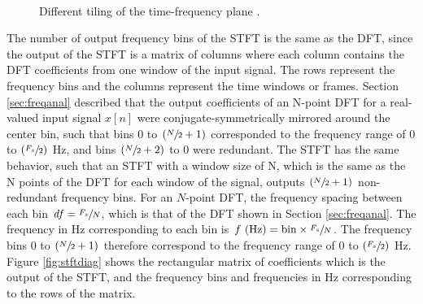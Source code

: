\documentclass[report.tex]{subfiles}
\begin{document}
\begin{figure}[ht]
	\centering
	\\
	\caption{Different tiling of the time-frequency plane \parencite[326, 327]{gabordiagrams}.}
	\label{fig:gabortf}
\end{figure}

The number of output frequency bins of the STFT is the same as the DFT, since the output of the STFT is a matrix of columns where each column contains the DFT coefficients from one window of the input signal. The rows represent the frequency bins and the columns represent the time windows or frames. Section \ref{sec:freqanal} described that the output coefficients of an N-point DFT for a real-valued input signal $x[n]$ were conjugate-symmetrically mirrored around the center bin, such that bins 0 to $(\sfrac{N}{2}+1)$ corresponded to the frequency range of 0 to $(\sfrac{F_{s}}{2})$ Hz, and bins $(\sfrac{N}{2}+2)$ to 0 were redundant. The STFT has the same behavior, such that an STFT with a window size of N, which is the same as the N points of the DFT for each window of the signal, outputs $(\sfrac{N}{2}+1)$ non-redundant frequency bins. For an $N$-point DFT, the frequency spacing between each bin $\mathit{df} = \sfrac{F_{s}}{N}$, which is that of the DFT shown in Section \ref{sec:freqanal}. The frequency in Hz corresponding to each bin is $f \text{ (Hz)} = \text{bin}\times\sfrac{F_{s}}{N}$. The frequency bins 0 to $(\sfrac{N}{2}+1)$ therefore correspond to the frequency range of 0 to $(\sfrac{F_{s}}{2})$ Hz. Figure \ref{fig:stftdiag} shows the rectangular matrix of coefficients which is the output of the STFT, and the frequency bins and frequencies in Hz corresponding to the rows of the matrix.
\end{document}
